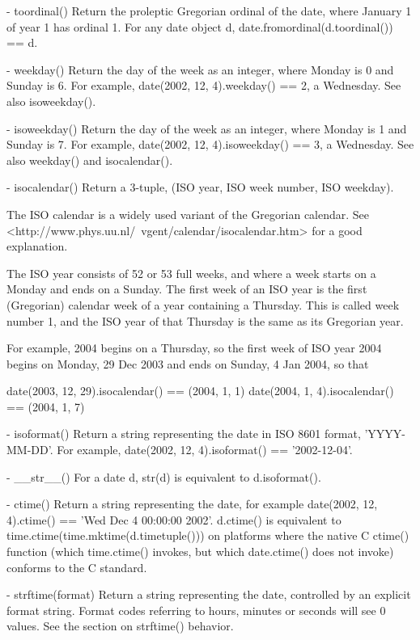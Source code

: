 {  - toordinal()
    Return the proleptic Gregorian ordinal of the date, where January 1
    of year 1 has ordinal 1.  For any date object d,
    date.fromordinal(d.toordinal()) == d.

  - weekday()
    Return the day of the week as an integer, where Monday is 0 and
    Sunday is 6.  For example, date(2002, 12, 4).weekday() == 2, a
    Wednesday.
    See also isoweekday().

  - isoweekday()
    Return the day of the week as an integer, where Monday is 1 and
    Sunday is 7.  For example, date(2002, 12, 4).isoweekday() == 3, a
    Wednesday.
    See also weekday() and isocalendar().

  - isocalendar()
    Return a 3-tuple, (ISO year, ISO week number, ISO weekday).

    The ISO calendar is a widely used variant of the Gregorian calendar.
    See <http://www.phys.uu.nl/~vgent/calendar/isocalendar.htm>
    for a good explanation.

    The ISO year consists of 52 or 53 full weeks, and where a week starts
    on a Monday and ends on a Sunday.  The first week of an ISO year is
    the first (Gregorian) calendar week of a year containing a Thursday.
    This is called week number 1, and the ISO year of that Thursday is
    the same as its Gregorian year.

    For example, 2004 begins on a Thursday, so the first week of ISO
    year 2004 begins on Monday, 29 Dec 2003 and ends on Sunday, 4 Jan
    2004, so that

    date(2003, 12, 29).isocalendar() == (2004, 1, 1)
    date(2004, 1, 4).isocalendar() == (2004, 1, 7)

  - isoformat()
    Return a string representing the date in ISO 8601 format,
    'YYYY-MM-DD'.  For example,
    date(2002, 12, 4).isoformat() == '2002-12-04'.

  - __str__()
    For a date d, str(d) is equivalent to d.isoformat().

  - ctime()
    Return a string representing the date, for example
    date(2002, 12, 4).ctime() == 'Wed Dec  4 00:00:00 2002'.
    d.ctime() is equivalent to time.ctime(time.mktime(d.timetuple()))
    on platforms where the native C ctime() function (which time.ctime()
    invokes, but which date.ctime() does not invoke) conforms to the
    C standard.

  - strftime(format)
    Return a string representing the date, controlled by an explicit
    format string.  Format codes referring to hours, minutes or seconds
    will see 0 values.  See the section on strftime() behavior.


}
